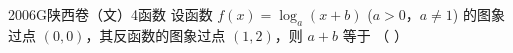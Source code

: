 
\begin{problem}{2006}{G}{陕西卷（文）}{4}{函数}
设函数 $ f(x) = \log_a (x + b) $ ($ a > 0 $，$ a \ne 1 $) 的图象过点 $ (0,0) $，其反函数的图象过点 $ (1,2) $，则 $ a + b $ 等于 （ ）
\begin{choices}
\end{choices}
\end{problem}

\begin{answer}

\end{answer}

\begin{solutions}

\end{solutions}